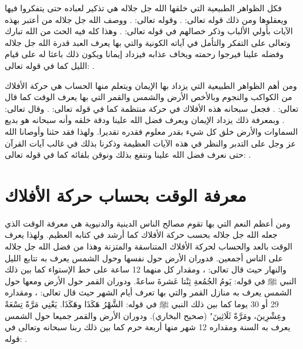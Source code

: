 فكل الظواهر الطبيعية التي خلقها الله جل جلاله هي تذكير لعباده حتى يتفكروا فيها ويعقلوها ومن ذلك قوله تعالى: \quranayah*[30][24]{\footnotesize \surahname*[30]}. وقوله تعالى: \quranayah*[45][13]{\footnotesize \surahname*[45]}. ووصف الله جل جلاله من أعتبر بهذه الآيات بأولي الألباب وذكر خصالهم في قوله تعالى: \quranayah*[3][190-191]{\footnotesize \surahname*[3]}. وهذا كله فيه الحث من الله تبارك وتعالى على التفكر والتأمل في آياته الكونية والتي بها يعرف العبد قدرة الله جل جلاله وفضله علينا فيرجوا رحمته ويخاف عذابه فيزداد إيمانا ويكون ذلك باعثا له على قيام الليل كما في قوله تعالى: \quranayah*[39][9]{\footnotesize \surahname*[3]}.

ومن أهم الظواهر الطبيعية التي يزداد بها الإيمان ويتعلم منها الحساب هي حركة الأفلاك من الكواكب والنجوم وبالأخص الأرض والشمس والقمر التي بها يعرف الوقت كما قال تعالى: \quranayah*[16][12]{\footnotesize \surahname*[16]}. فجعل سبحانه هذه الأفلاك في حركة منتظمة كما في قوله تعالى: \quranayah*[21][33]{\footnotesize \surahname*[21]}. وقال تعالى: \quranayah*[36][40]{\footnotesize \surahname*[36]}. وبمعرفة ذلك يزداد الإيمان ويعرف فضل الله علينا ودقة خلقه وأنه سبحانه هو بديع السماوات والأرض خلق كل شيء بقدر معلوم فقدره تقديرا. ولهذا فقد حثنا وأوصانا الله عز وجل على التدبر والنظر في هذه الآيات العظيمة وذكرنا بذلك في غالب آيات القرآن حتى نعرف فضل الله علينا ونتفع بذلك ونوقن بلقائه كما في قوله تعالى: \quranayah*[13][2]{\footnotesize \surahname*[13]}.

\section{معرفة الوقت بحساب حركة الأفلاك}

ومن أعظم النعم التي بها تقوم مصالح الناس الدينية والدنيوية هي معرفة الوقت الذي جعله الله جل جلاله بحسب حركة الأفلاك كما أرشد في كتابه العظيم. ولهذا يعرف الوقت بالعد والحساب لحركة الأفلاك المتناسقة والمتزنة وهذا من فضل الله جل جلاله على الناس أجمعين. فدوران الأرض حول نفسها وحول الشمس يعرف به تتابع الليل والنهار حيث قال تعالى: \quranayah*[25][62]{\footnotesize \surahname*[25]}، ومقدار كل منهما 12 ساعة على خط الإستواء كما بين ذلك النبي ﷺ في قوله: يَومُ الجُمُعةِ ثِنْتا عَشرةَ ساعةً. ودوران القمر حول الأرض ومعها حول الشمس يعرف به منازل القمر والتي بها تعرف أيام الشهر حيث قال تعالى: \quranayah*[36][39]{\footnotesize \surahname*[36]}، ومقداره 29 أو 30 يوما كما بين ذلك النبي ﷺ في قوله: الشَّهْرُ هَكَذَا وهَكَذَا. يَعْنِي مَرَّةً تِسْعَةً وعِشْرِينَ، ومَرَّةً ثَلَاثِينَ" {\footnotesize (صحيح البخاري)}. ودوران الأرض والقمر جميعا حول الشمس يعرف به السنة ومقداره 12 شهر منها أربعة حرم كما بين ذلك ربنا سبحانه وتعالى في قوله: \quranayah*[9][36]{\footnotesize \surahname*[9]}. 

